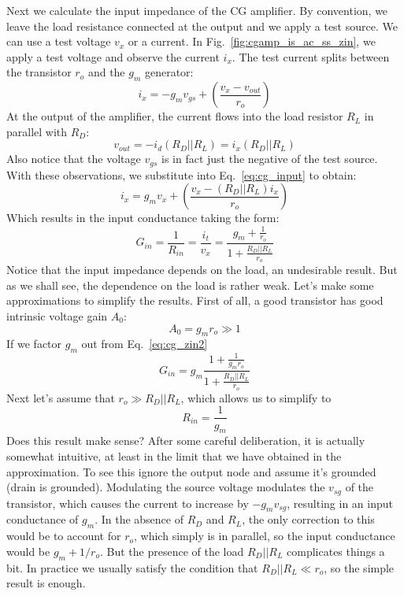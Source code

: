 Next we calculate the input impedance of the CG amplifier.  By convention, we leave the load resistance connected at the output and we apply a test source.  We can use a test voltage $v_x$ or a current.  In Fig.~\ref{fig:cgamp_is_ac_ss_zin}, we apply a test voltage and observe the current $i_x$.  The test current splits between the transistor $r_o$ and the $g_m$ generator:
%
\begin{equation}
	{i_x} =  - {g_m}{v_{gs}} + \left( {\frac{{{v_x} - {v_{out}}}}{{{r_o}}}} \right) \label{eq:cg_input}
\end{equation}
%
At the output of the amplifier, the current flows into the load resistor $R_L$ in parallel with $R_D$:
%
\begin{equation}
	{v_{out}} =  - {i_d}({R_D}||{R_L}) = {i_x}({R_D}||{R_L})
\end{equation}
%
Also notice that the voltage $v_{gs}$ is in fact just the negative of the test source.  With these observations, we substitute into Eq.~\ref{eq:cg_input} to obtain:
%
\begin{equation}
	{i_x} = {g_m}{v_x} + \left( {\frac{{{v_x} - \left( {{R_D}||{R_L}} \right){i_x}}}{{{r_o}}}} \right)
\end{equation}
%
Which results in the input conductance taking the form:
%
\begin{equation}
	G_{in} = \frac{1}{{{R_{in}}}} = \frac{{{i_t}}}{{{v_x}}} = \frac{{{g_m} + \frac{1}{{{r_o}}}}}{{1 + \frac{{{R_D}||{R_L}}}{{{r_o}}}}} \label{eq:cg_zin2}
\end{equation}
%
Notice that the input impedance depends on the load, an undesirable result.  But as we shall see, the dependence on the load is rather weak.  Let's make some approximations to simplify the results.  First of all, a good transistor has good intrinsic voltage gain $A_0$: 
%
\begin{equation}
	A_0 = g_m r_o \gg 1
\end{equation}
%
If we factor $g_m$ out from Eq.~\ref{eq:cg_zin2}
%
\begin{equation}
	G_{in} = g_m \frac{{1 + \frac{1}{{{g_m r_o}}}}}{{1 + \frac{{{R_D}||{R_L}}}{{{r_o}}}}}
\end{equation}
%
Next let's assume that $r_o \gg R_D||R_L$, which allows us to simplify to
%
\begin{equation}
	{R_{in}} = \frac{1}{{{g_m}}}
\end{equation}
%
Does this result make sense?  After some careful deliberation, it is actually somewhat intuitive, at least in the limit that we have obtained in the approximation.  To see this ignore the output node and assume it's grounded (drain is grounded). Modulating the source voltage modulates the $v_{sg}$ of the transistor, which causes the current to increase by $-g_m v_{sg}$, resulting in an input conductance of $g_m$.  In the absence of $R_D$ and $R_L$, the only correction to this would be to account for $r_o$, which simply is in parallel, so the input conductance would be $g_m + 1/r_o$.  But the presence of the load $R_D || R_L$ complicates things a bit.  In practice we usually satisfy the condition that $R_D || R_L \ll r_o$, so the simple result is enough. 



